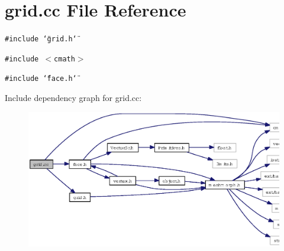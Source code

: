 \section{grid.cc File Reference}
\label{grid_8cc}
{\tt \#include \char`\"{}grid.h\char`\"{}}\par
{\tt \#include $<$cmath$>$}\par
{\tt \#include \char`\"{}face.h\char`\"{}}\par


Include dependency graph for grid.cc:\begin{figure}[H]
\begin{center}
\leavevmode
\includegraphics[width=323pt]{grid_8cc__incl}
\end{center}
\end{figure}
